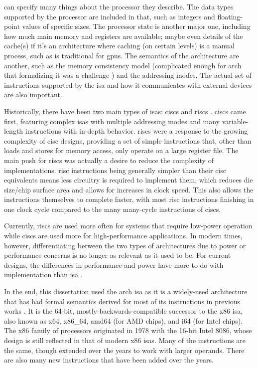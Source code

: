  can specify many things about the processor they describe.
The data types supported by the processor are included in that,
such as integers and floating-point values of specific sizes.
The processor state is another major one, including how much main memory and registers
are available; maybe even details of the cache(s) if it's an architecture
where caching (on certain levels) is a manual process, such as is traditional
for \acp{gpu}.
The semantics of the architecture are another, such as the memory consistency model
(complicated enough for \gls{arch} that formalizing it was a challenge
\autocite{sewell2010tso,owens2009tso,owens2009tsoextended})
and the addressing modes.
The actual set of instructions supported by the \ac{isa}
and how it communicates with external devices are also important.

Historically, there have been two main types of \acp{isa}:
\acp{cisc} and \acp{risc} \autocite{jamil1995rc}.
\Acp{cisc} came first, featuring complex \acp{isa} with multiple addressing modes
and many variable-length instructions with in-depth behavior.
\Acp{risc} were a response to the growing complexity of \ac{cisc} designs,
providing a set of simple instructions that,
other than loads and stores for memory access, only operate on a large register file.
The main push for \acp{risc} was actually a desire
to reduce the complexity of implementations. \Ac{risc} instructions being
generally simpler than their \ac{cisc} equivalents
means less circuitry is required to implement them,
which reduces die size/chip surface area and allows for increases in clock speed.
This also allows the instructions themselves to complete faster,
with most \ac{risc} instructions finishing in one clock cycle
compared to the many many-cycle instructions of \acp{cisc}.

Currently, \acp{risc} are used more often for systems that require
low-power operation while \acp{cisc} are used more for high-performance applications.
In modern times, however, differentiating between the two types of architectures
due to power or performance concerns is no longer as relevant as it used to be.
For current designs, the differences in performance and power
have more to do with implementation than \ac{isa} \autocite{blem2013struggles}.

In the end,
this dissertation used the \gls{arch} \ac{isa} as it is a widely-used architecture
that has had formal semantics derived for most of its instructions
in previous works \autocite{heule2016stratified,roessle2019verified}.
It is the 64-bit, mostly-backwards-compatible successor to the \gls{x86} \ac{isa},
also known as \gls{x64}, \gls{x86_64}, \gls{amd64} (for AMD chips), and \gls{i64} (for Intel chips).
The \gls{x86} family of processors originated in 1978 with the 16-bit Intel 8086,
whose design is still reflected in that of modern \gls{x86} \acp{isa}.
Many of the instructions are the same,
though extended over the years to work with larger operands.
There are also many new instructions that have been added over the years.

